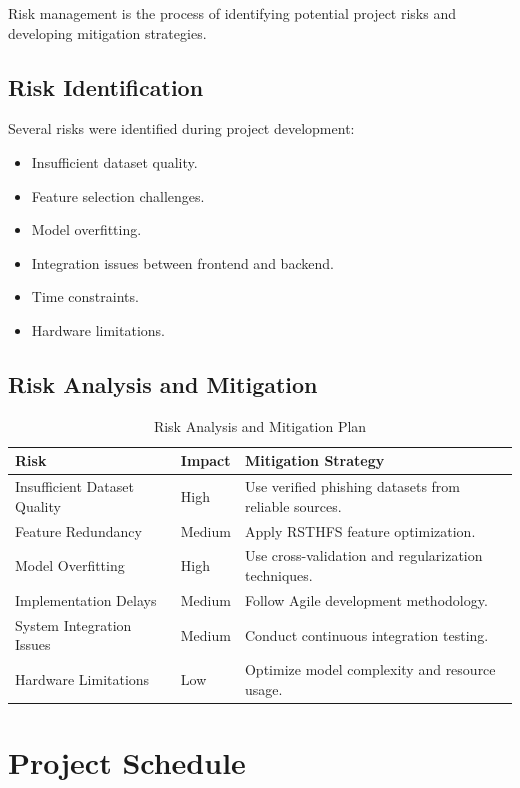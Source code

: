 \documentclass[12pt]{report}
\begin{document}
Risk management is the process of identifying potential project risks and developing mitigation strategies.

\subsection{Risk Identification}

Several risks were identified during project development:

\begin{itemize}
    \item Insufficient dataset quality.
    \item Feature selection challenges.
    \item Model overfitting.
    \item Integration issues between frontend and backend.
    \item Time constraints.
    \item Hardware limitations.
\end{itemize}

\subsection{Risk Analysis and Mitigation}

\begin{table}[H]
\centering
\caption{Risk Analysis and Mitigation Plan}
\begin{tabular}{|p{4cm}|p{2cm}|p{5cm}|}
\hline
\textbf{Risk} & \textbf{Impact} & \textbf{Mitigation Strategy} \\
\hline
Insufficient Dataset Quality & High & Use verified phishing datasets from reliable sources. \\
\hline
Feature Redundancy & Medium & Apply RSTHFS feature optimization. \\
\hline
Model Overfitting & High & Use cross-validation and regularization techniques. \\
\hline
Implementation Delays & Medium & Follow Agile development methodology. \\
\hline
System Integration Issues & Medium & Conduct continuous integration testing. \\
\hline
Hardware Limitations & Low & Optimize model complexity and resource usage. \\
\hline
\end{tabular}
\end{table}

\section{Project Schedule}
\end{document}
